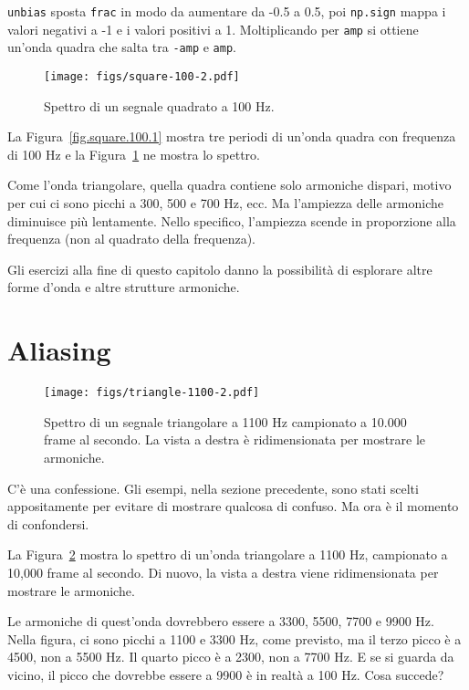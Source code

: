 \documentclass[12pt,a4paper]{book}
\begin{document}
{\tt unbias} sposta {\tt frac} in modo da aumentare da -0.5 a 0.5, poi {\tt np.sign} mappa i valori negativi a -1 e i valori positivi a 1. Moltiplicando per {\tt amp} si ottiene un'onda quadra che salta tra {\tt -amp} e {\tt amp}.

\begin{figure} 

\centerline{\texttt{[image: figs/square-100-2.pdf]}} \caption{Spettro di un segnale quadrato a 100 Hz.} \label{fig.square.100.2} \end{figure} 

La Figura~\ref{fig.square.100.1} mostra tre periodi di un'onda quadra con frequenza di 100 Hz e la Figura~\ref{fig.square.100.2} ne mostra lo spettro.

Come l'onda triangolare, quella quadra contiene solo armoniche dispari, motivo per cui ci sono picchi a 300, 500 e 700 Hz, ecc. Ma l'ampiezza delle armoniche diminuisce più lentamente. Nello specifico, l'ampiezza scende in proporzione alla frequenza (non al quadrato della frequenza).

Gli esercizi alla fine di questo capitolo danno la possibilità di esplorare altre forme d'onda e altre strutture armoniche.

\section{Aliasing} \label{aliasing} 

\begin{figure} 

\centerline{\texttt{[image: figs/triangle-1100-2.pdf]}} \caption{Spettro di un segnale triangolare a 1100 Hz campionato a 10.000 frame al secondo. La vista a destra è ridimensionata per mostrare le armoniche.} \label{fig.triangle.1100.2} \end{figure} 

C'è una confessione. Gli esempi, nella sezione precedente, sono stati scelti appositamente per evitare di mostrare qualcosa di confuso. Ma ora è il momento di confondersi.

La Figura~\ref{fig.triangle.1100.2} mostra lo spettro di un'onda triangolare a 1100 Hz, campionato a 10,000 frame al secondo. Di nuovo, la vista a destra viene ridimensionata per mostrare le armoniche.

Le armoniche di quest'onda dovrebbero essere a 3300, 5500, 7700 e 9900 Hz. Nella figura, ci sono picchi a 1100 e 3300 Hz, come previsto, ma il terzo picco è a 4500, non a 5500 Hz. Il quarto picco è a 2300, non a 7700 Hz. E se si guarda da vicino, il picco che dovrebbe essere a 9900 è in realtà a 100 Hz. Cosa succede?
\end{document}
